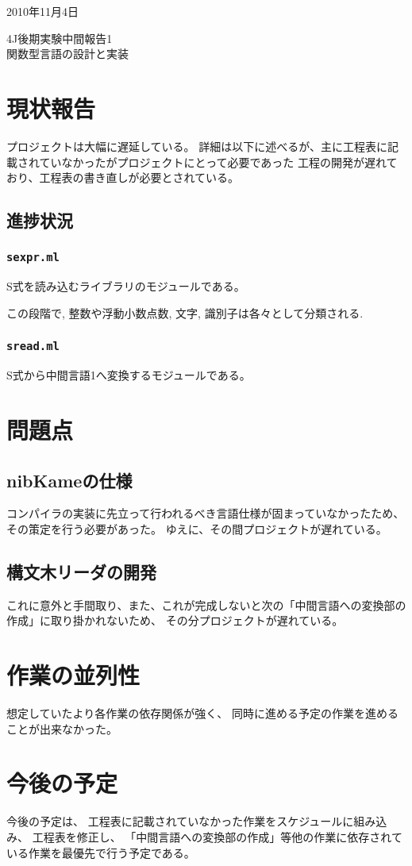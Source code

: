 \documentclass[a4paper, 10pt, oneside, notitlepage, onecolumn]{jsarticle}
\author{}
\begin{document}
\begin{flushright}
    2010年11月4日
\end{flushright}
\begin{center}
    4J後期実験中間報告1\\
\hspace{0.1em}
    \textsc{\LARGE 関数型言語の設計と実装}
\end{center}
\begin{flushright}
\end{flushright}
\section{現状報告}
プロジェクトは大幅に遅延している。
詳細は以下に述べるが、主に工程表に記載されていなかったがプロジェクトにとって必要であった
工程の開発が遅れており、工程表の書き直しが必要とされている。

\subsection{進捗状況}
\subsubsection{\texttt{sexpr.ml}}
S式を読み込むライブラリのモジュールである。

この段階で, 整数や浮動小数点数, 文字, 識別子は各々として分類される.

\subsubsection{\texttt{sread.ml}}
S式から中間言語1へ変換するモジュールである。

\section{問題点}
\subsection{nibKameの仕様}
コンパイラの実装に先立って行われるべき言語仕様が固まっていなかったため、その策定を行う必要があった。
ゆえに、その間プロジェクトが遅れている。

\subsection{構文木リーダの開発}
これに意外と手間取り、また、これが完成しないと次の「中間言語への変換部の作成」に取り掛かれないため、
その分プロジェクトが遅れている。

\section{作業の並列性}
想定していたより各作業の依存関係が強く、
同時に進める予定の作業を進めることが出来なかった。

\section{今後の予定}
今後の予定は、
工程表に記載されていなかった作業をスケジュールに組み込み、
工程表を修正し、
「中間言語への変換部の作成」等他の作業に依存されている作業を最優先で行う予定である。
\end{document}
